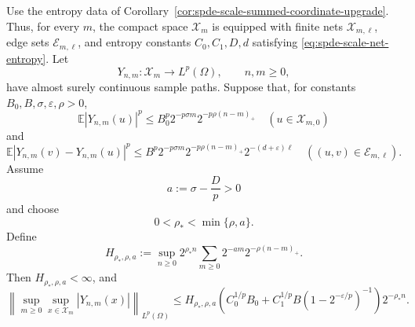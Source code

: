 \begin{corollary}
\label{cor:spde-scale-summed-shell-separated-cutoff-bridge}
Use the entropy data of
Corollary~\ref{cor:spde-scale-summed-coordinate-upgrade}.  Thus, for every
\(m\), the compact space \(\mathcal X_m\) is equipped with finite nets
\(\mathcal X_{m,\ell}\), edge sets \(\mathcal E_{m,\ell}\), and entropy
constants \(C_0,C_1,D,d\) satisfying \eqref{eq:spde-scale-net-entropy}.  Let
\[
  Y_{n,m}:\mathcal X_m\to L^p(\Omega),
  \qquad n,m\geq0,
\]
have almost surely continuous sample paths.  Suppose that, for constants
\(B_0,B,\sigma,\varepsilon,\rho>0\),
\begin{equation}
  \mathbb E|Y_{n,m}(u)|^p
  \leq
  B_0^p2^{-p\sigma m}2^{-p\rho(n-m)_+}
  \quad(u\in\mathcal X_{m,0})
  \label{eq:spde-scale-shell-base-moment}
\end{equation}
and
\begin{equation}
  \mathbb E|Y_{n,m}(v)-Y_{n,m}(u)|^p
  \leq
  B^p2^{-p\sigma m}2^{-p\rho(n-m)_+}2^{-(d+\varepsilon)\ell}
  \quad((u,v)\in\mathcal E_{m,\ell}).
  \label{eq:spde-scale-shell-edge-moment}
\end{equation}
Assume
\[
  a:=\sigma-\frac{D}{p}>0
\]
and choose
\[
  0<\rho_*<\min\{\rho,a\}.
\]
Define
\begin{equation}
  H_{\rho_*,\rho,a}
  :=
  \sup_{n\geq0}
  2^{\rho_* n}
  \sum_{m\geq0}2^{-a m}2^{-\rho(n-m)_+}.
  \label{eq:spde-scale-shell-bridge-constant}
\end{equation}
Then \(H_{\rho_*,\rho,a}<\infty\), and
\begin{equation}
  \left\|
    \sup_{m\geq0}\sup_{x\in\mathcal X_m}|Y_{n,m}(x)|
  \right\|_{L^p(\Omega)}
  \leq
  H_{\rho_*,\rho,a}
  \left(
    C_0^{1/p}B_0+
    C_1^{1/p}B(1-2^{-\varepsilon/p})^{-1}
  \right)
  2^{-\rho_* n}.
  \label{eq:spde-scale-shell-summed-cutoff-bound}
\end{equation}
\end{corollary}

